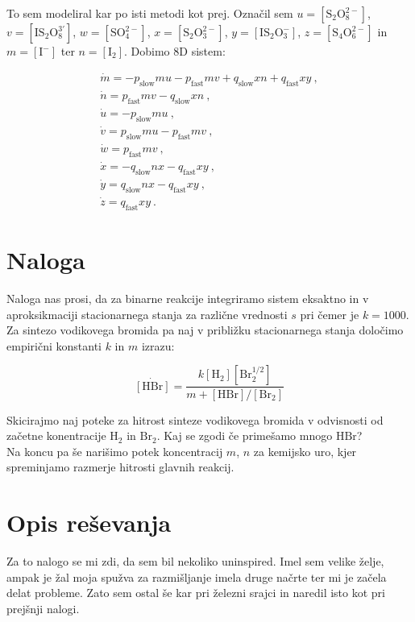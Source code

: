 \documentclass[a4paper]{article}
\begin{document}
To sem modeliral kar po isti metodi kot prej. Označil sem $u = [\mathrm{S}_2\mathrm{O}_8^{2-}]$,
$v = [\mathrm{I}\mathrm{S}_2\mathrm{O}_8^{3'}]$, $w = [\mathrm{S}\mathrm{O}_4^{2-}]$,
$x = [\mathrm{S}_2\mathrm{O}_3^{2-}]$, $y = [\mathrm{I}\mathrm{S}_2\mathrm{O}_3^{-}]$, $z = [\mathrm{S}_4\mathrm{O}_6^{2-}]$
in $m = [\mathrm{I}^-]$ ter $n = [\mathrm{I}_2]$. Dobimo 8D sistem:

\begin{gather}
    \dot{m} = - p_\mathrm{slow}mu - p_\mathrm{fast}mv + q_\mathrm{slow}xn + q_\mathrm{fast}xy\>,\\
    \dot{n} = p_\mathrm{fast}mv - q_\mathrm{slow}xn\>,\\
    \dot{u} = - p_\mathrm{slow}mu\>,\\
    \dot{v} = p_\mathrm{slow}mu - p_\mathrm{fast}mv\>,\\
    \dot{w} = p_\mathrm{fast}mv\>,\\
    \dot{x} = - q_\mathrm{slow}nx - q_\mathrm{fast}xy\>,\\
    \dot{y} = q_\mathrm{slow}nx - q_\mathrm{fast}xy\>,\\
    \dot{z} = q_\mathrm{fast}xy\>.
\end{gather}


\section{Naloga}
Naloga nas prosi, da za binarne reakcije integriramo sistem eksaktno in
v aproksikmaciji stacionarnega stanja za različne vrednosti $s$ pri čemer je 
$k=1000$. Za sintezo vodikovega bromida pa naj v približku stacionarnega stanja
določimo empirični konstanti $k$ in $m$ izrazu:

\begin{equation}
    \dot{[\mathrm{HBr}]} = \frac{k[\mathrm{H}_2][\mathrm{Br}_2^{1/2}]}{m + [\mathrm{HBr}]/[\mathrm{Br}_2]}
\end{equation}

Skicirajmo naj poteke za hitrost sinteze vodikovega bromida v odvisnosti od začetne konentracije 
$\mathrm{H}_2$ in $\mathrm{Br}_2$. Kaj se zgodi če primešamo mnogo $\mathrm{HBr}$?\\

Na koncu pa še narišimo potek koncentracij $m$, $n$ za kemijsko uro, kjer spreminjamo razmerje
hitrosti glavnih reakcij.\\

\section{Opis reševanja}
Za to nalogo se mi zdi, da sem bil nekoliko uninspired. Imel sem velike želje, ampak je žal moja 
spužva za razmišljanje imela druge načrte ter mi je začela delat probleme. Zato sem ostal še kar 
pri železni srajci in naredil isto kot pri prejšnji nalogi. \\
\end{document}
